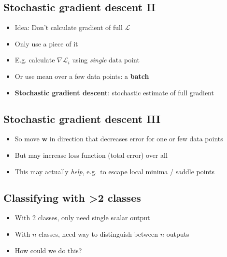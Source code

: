 \hypertarget{stochastic-gradient-descent-ii}{%
\subsection{Stochastic gradient descent
II}\label{stochastic-gradient-descent-ii}}

\begin{itemize}
\item
  Idea: Don't calculate gradient of full \(\mathcal{L}\)
\item
  Only use a piece of it
\item
  E.g. calculate \(\nabla \mathcal{L}_i\) using \emph{single} data point
\item
  Or use mean over a few data points: a \textbf{batch}
\item
  \textbf{Stochastic gradient descent}: stochastic estimate of full
  gradient
\end{itemize}

\hypertarget{stochastic-gradient-descent-iii}{%
\subsection{Stochastic gradient descent
III}\label{stochastic-gradient-descent-iii}}

\begin{itemize}
\item
  So move \(\mathbf{w}\) in direction that decreases error for one or
  few data points
\item
  But may increase loss function (total error) over all
\item
  This may actually \emph{help}, e.g.~to escape local minima / saddle
  points
\end{itemize}

\hypertarget{classifying-with-2-classes}{%
\subsection{Classifying with \textgreater2
classes}\label{classifying-with-2-classes}}

\begin{itemize}
\item
  With 2 classes, only need single scalar output
\item
  With \(n\) classes, need way to distinguish between \(n\) outputs
\item
  How could we do this?
\end{itemize}

